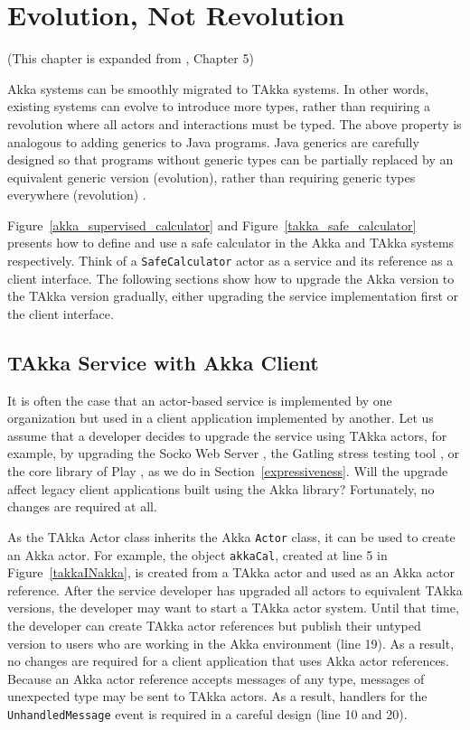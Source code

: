 \chapter{Evolution, Not Revolution }
\label{evolution}

\begin{center}
(This chapter is expanded from\citep{TAKKA_paper} , Chapter 5)
\end{center}
\vspace{12 pt}

Akka systems can be smoothly migrated to TAkka systems. In other words, 
existing systems can evolve to introduce more types, rather than requiring a 
revolution where all actors and interactions must be typed.
The above property is analogous to adding generics to Java programs.  Java 
generics are carefully designed so that programs without generic types can be 
partially replaced by an equivalent generic version (evolution), rather than 
requiring generic types everywhere (revolution) \citep{JGC}.

Figure~\ref{akka_supervised_calculator} and Figure~\ref{takka_safe_calculator} 
presents how to define and use a safe calculator
in the Akka and TAkka systems respectively.  Think of a {\tt SafeCalculator} actor
as a service and its reference as a client interface.  The following sections show how to upgrade
the Akka version to the TAkka version gradually, either upgrading the 
service implementation first or the client interface.


\section{TAkka Service with Akka Client}

It is often the case that an actor-based service is implemented by one 
organization but used in a client application implemented by another.  
Let us assume that a developer decides to upgrade the service 
using TAkka actors, for example, by upgrading the Socko Web Server 
\citep{SOCKO}, the Gatling stress testing tool \citep{Gatling}, or the core 
library of Play \citep{play_doc}, as we do in Section~\ref{expressiveness}.  
Will the upgrade affect legacy client applications
built using the Akka library?  Fortunately, no changes are required at all.

As the TAkka {Actor} class inherits the Akka {\tt Actor} class, it can be used 
to create an Akka actor.  For example, the object {\tt akkaCal}, created at line 
5 in Figure~\ref{takkaINakka}, is created from a TAkka actor and used as an Akka
actor reference.  After the service developer has upgraded all actors to equivalent 
TAkka versions, the developer may want to start a TAkka actor system.  Until that
time, the developer can create TAkka actor references but publish their untyped
version to users who are working in the Akka environment (line 19).
As a result, no changes are required for a client 
application that uses Akka actor references.  Because an Akka actor reference 
accepts messages of any type, messages of unexpected type may be sent to TAkka actors.  
As a result, handlers for the {\tt UnhandledMessage} event is required in a
careful design (line 10 and 20).


